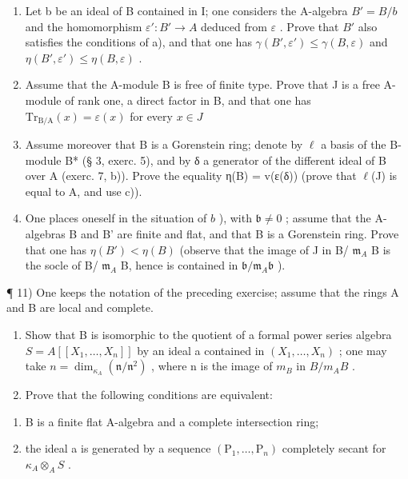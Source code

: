 \begin{enumerate}
\def\labelenumi{\alph{enumi})}
\setcounter{enumi}{1}
\item
  Let b be an ideal of B contained in I; one considers the A-algebra \(B' = B/b\) and the homomorphism \(\varepsilon': B' \to A\) deduced from \(\varepsilon\) . Prove that \(B'\) also satisfies the conditions of a), and that one has \(\gamma(B', \varepsilon') \leqslant \gamma(B, \varepsilon)\) and \(\eta(B', \varepsilon') \leqslant \eta(B, \varepsilon)\) .
\item
  Assume that the A-module B is free of finite type. Prove that J is a free A-module of rank one, a direct factor in B, and that one has \(\mathrm{Tr}_{\mathrm{B / A}}(x) = \varepsilon (x)\) for every \(x\in J\)
\item
  Assume moreover that B is a Gorenstein ring; denote by \(\ell\) a basis of the B-module B* (§ 3, exerc. 5), and by δ a generator of the different ideal of B over A (exerc. 7, b)). Prove the equality η(B) = v(ε(δ)) (prove that \(\ell\)(J) is equal to A, and use c)).
\item
  One places oneself in the situation of \(b\) ), with \(\mathfrak{b} \neq 0\) ; assume that the A-algebras B and B' are finite and flat, and that B is a Gorenstein ring. Prove that one has \(\eta(B') < \eta(B)\) (observe that the image of J in B/ \(\mathfrak{m}_{A}\) B is the socle of B/ \(\mathfrak{m}_{A}\) B, hence is contained in \(\mathfrak{b}/\mathfrak{m}_{A}\mathfrak{b}\) ).
\end{enumerate}

¶ 11) One keeps the notation of the preceding exercise; assume that the rings A and B are local and complete.

\begin{enumerate}
\def\labelenumi{\alph{enumi})}
\item
  Show that B is isomorphic to the quotient of a formal power series algebra \(S = A[[X_{1}, \ldots, X_{n}]]\) by an ideal a contained in \((X_{1}, \ldots, X_{n})\) ; one may take \(n = \dim_{\kappa_{A}}(\mathfrak{n}/\mathfrak{n}^{2})\) , where n is the image of \(m_{B}\) in \(B/m_{A}B\) .
\item
  Prove that the following conditions are equivalent:
\end{enumerate}

\begin{enumerate}
\def\labelenumi{(\roman{enumi})}
\item
  B is a finite flat A-algebra and a complete intersection ring;
\item
  the ideal a is generated by a sequence \((\mathrm{P}_{1},\ldots,\mathrm{P}_{n})\) completely secant for \(\kappa_{A}\otimes_{A}S\) .
\end{enumerate}

